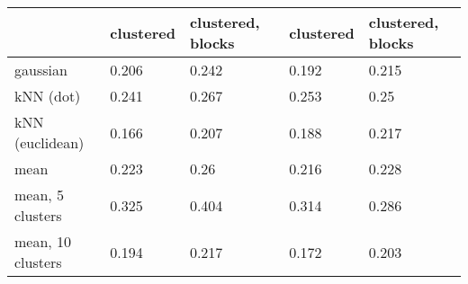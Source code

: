 \begin{tabular}{lllll}
\toprule
                  & clustered & clustered, blocks & clustered & clustered, blocks\\
\midrule
gaussian          & 0.206     & 0.242             & 0.192     & 0.215\\
kNN (dot)         & 0.241     & 0.267             & 0.253     & 0.25\\
kNN (euclidean)   & 0.166     & 0.207             & 0.188     & 0.217\\
mean              & 0.223     & 0.26              & 0.216     & 0.228\\
mean, 5 clusters  & 0.325     & 0.404             & 0.314     & 0.286\\
mean, 10 clusters & 0.194     & 0.217             & 0.172     & 0.203\\
\bottomrule
\end{tabular}

